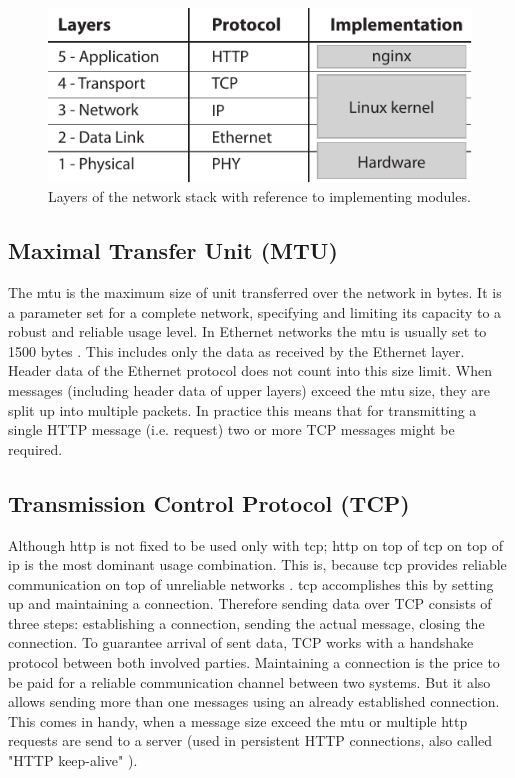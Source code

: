 \begin{figure}[H]
	\centering
	\includegraphics[scale=1]{images/network-layers.pdf}
	\caption{Layers of the network stack with reference to implementing modules.}
	\label{fig:net-layers}
\end{figure}

\subsection{Maximal Transfer Unit (MTU)}
\label{subsec:mtu}

The \gls{mtu} is the maximum size of unit transferred over the network in bytes. It is a parameter set for a complete network, specifying and limiting its capacity to a robust and reliable usage level. In Ethernet networks the \gls{mtu} is usually set to 1500 bytes \cite{kn1}. This includes only the data as received by the Ethernet layer. Header data of  the Ethernet protocol does not count into this size limit. When messages (including header data of upper layers) exceed the \gls{mtu} size, they are split up into multiple packets. In practice this means that for transmitting a single HTTP message (i.e. request) two or more TCP messages might be required.

\subsection{Transmission Control Protocol (TCP)}

Although \gls{http} is not fixed to be used only with \gls{tcp}; \gls{http} on top of \gls{tcp} on top of \gls{ip} is the most dominant usage combination. This is, because \gls{tcp} provides reliable communication on top of unreliable networks \cite{tcp}. \gls{tcp} accomplishes this by setting up and maintaining a connection. Therefore sending data over TCP consists of three steps: establishing a connection, sending the actual message, closing the connection. To guarantee arrival of sent data, TCP works with a handshake protocol between both involved parties. Maintaining a connection is the price to be paid for a reliable communication channel between two systems. But it also allows sending more than one messages using an already established connection. This comes in handy, when a message size exceed the \gls{mtu} or multiple \gls{http} requests are send to a server (used in persistent HTTP connections, also called "HTTP keep-alive" \cite{http}).

